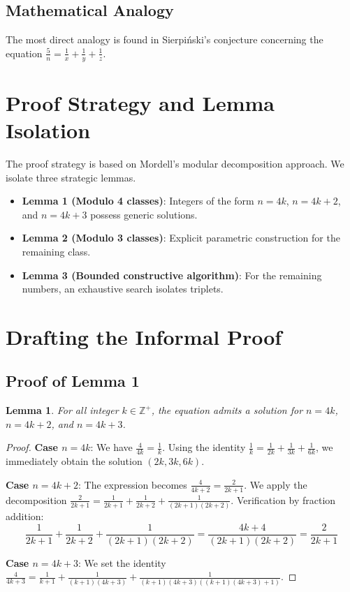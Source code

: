\documentclass[11pt,a4paper]{article}
\newtheorem{lemma}[theorem]{Lemma}
\begin{document}
\subsection{Mathematical Analogy}
The most direct analogy is found in Sierpi\'{n}ski's conjecture concerning the equation $\frac{5}{n} = \frac{1}{x} + \frac{1}{y} + \frac{1}{z}$.

\section{Proof Strategy and Lemma Isolation}

The proof strategy is based on Mordell's modular decomposition approach. We isolate three strategic lemmas.

\begin{itemize}
\item \textbf{Lemma 1 (Modulo 4 classes)}: Integers of the form $n = 4k$, $n = 4k+2$, and $n = 4k+3$ possess generic solutions.
\item \textbf{Lemma 2 (Modulo 3 classes)}: Explicit parametric construction for the remaining class.
\item \textbf{Lemma 3 (Bounded constructive algorithm)}: For the remaining numbers, an exhaustive search isolates triplets.
\end{itemize}

\section{Drafting the Informal Proof}

\subsection{Proof of Lemma 1}
\begin{lemma}
For all integer $k \in \mathbb{Z}^{+}$, the equation admits a solution for $n = 4k$, $n = 4k+2$, and $n = 4k+3$.
\end{lemma}

\begin{proof}
\textbf{Case $n = 4k$}: We have $\frac{4}{4k} = \frac{1}{k}$. Using the identity $\frac{1}{k} = \frac{1}{2k} + \frac{1}{3k} + \frac{1}{6k}$, we immediately obtain the solution $(2k, 3k, 6k)$.

\textbf{Case $n = 4k+2$}: The expression becomes $\frac{4}{4k+2} = \frac{2}{2k+1}$. We apply the decomposition $\frac{2}{2k+1} = \frac{1}{2k+1} + \frac{1}{2k+2} + \frac{1}{(2k+1)(2k+2)}$. Verification by fraction addition:
$$ \frac{1}{2k+1} + \frac{1}{2k+2} + \frac{1}{(2k+1)(2k+2)} = \frac{4k+4}{(2k+1)(2k+2)} = \frac{2}{2k+1} $$

\textbf{Case $n = 4k+3$}: We set the identity $\frac{4}{4k+3} = \frac{1}{k+1} + \frac{1}{(k+1)(4k+3)} + \frac{1}{(k+1)(4k+3)((k+1)(4k+3)+1)}$.
\end{proof}
\end{document}
